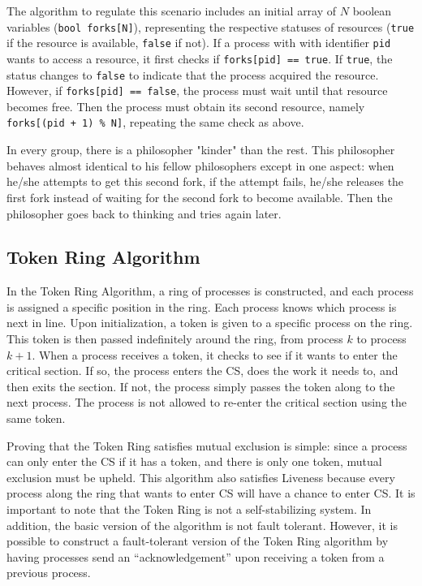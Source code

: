 \documentclass[12pt]{article}
\begin{document}
\begin{flushleft}
The algorithm to regulate this scenario includes an initial array of $N$ boolean variables (\texttt{bool forks[N]}), representing the respective statuses of resources (\texttt{true} if the resource is available, \texttt{false} if not). If a process with with identifier \texttt{pid} wants to access a resource, it first checks if \texttt{forks[pid] == true}. If \texttt{true}, the status changes to \texttt{false} to indicate that the process acquired the resource. However, if \texttt{forks[pid] ==  false}, the process must wait until that resource becomes free. Then the process must obtain its second resource, namely \texttt{forks[(pid + 1) \% N]}, repeating the same check as above.

In every group, there is a philosopher "kinder" than the rest. This philosopher behaves almost identical to his fellow philosophers except in one aspect: when he/she attempts to get this second fork, if the attempt fails, he/she releases the first fork instead of waiting for the second fork to become available. Then the philosopher goes back to thinking and tries again later.

\subsection{Token Ring Algorithm}
In the Token Ring Algorithm, a ring of processes is constructed, and each process is assigned a specific position in the ring. Each process knows which process is next in line. Upon initialization, a token is given to a specific process on the ring. This token is then passed indefinitely around the ring, from process $k$ to process $k+1$. When a process receives a token, it checks to see if it wants to enter the critical section. If so, the process enters the CS, does the work it needs to, and then exits the section. If not, the process simply passes the token along to the next process. The process is not allowed to re-enter the critical section using the same token. 

Proving that the Token Ring satisfies mutual exclusion is simple: since a process can only enter the CS if it has a token, and there is only one token, mutual exclusion must be upheld. This algorithm also satisfies Liveness because every process along the ring that wants to enter CS will have a chance to enter CS. 
It is important to note that the Token Ring is not a self-stabilizing system. In addition, the basic version of the algorithm is not fault tolerant. However, it is possible to construct a fault-tolerant version of the Token Ring algorithm by having processes send an “acknowledgement” upon receiving a token from a previous process.

\end{flushleft}
\end{document}
